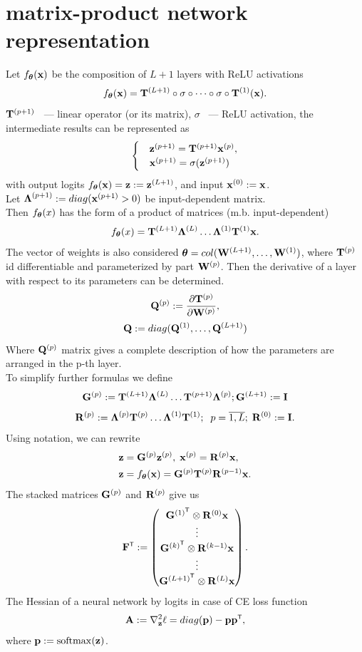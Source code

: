 \documentclass[conference]{IEEEtran}
\begin{document}
\section{matrix-product network representation}
Let $f_{\boldsymbol{\theta}}(\mathbf{x})$ be the composition of $L+1$ layers with ReLU activations
\[f_{\boldsymbol{\theta}}(\mathbf{x}) = \mathbf{T}^{(L+1)} \circ \sigma \circ \dots \circ \sigma \circ \mathbf{T}^{(1)}(\mathbf{x}).\]
$\mathbf{T}^{(p+1)}$ ~--- linear operator (or its matrix), $\sigma$ ~--- ReLU activation, the intermediate results can be represented as
\begin{align*}
  \begin{cases}
    & \mathbf{z}^{(p+1)} = \mathbf{T}^{(p+1)}\mathbf{x}^{(p)}, \\
    & \mathbf{x}^{(p+1)} = \sigma(\mathbf{z}^{(p+1)})
  \end{cases}
\end{align*}
with output logits $f_{\boldsymbol{\theta}}(\mathbf{x}) = \mathbf{z} := \mathbf{z}^{(L+1)}$, and input $\mathbf{x}^{(0)} := \mathbf{x}$. \\
Let $\boldsymbol{\Lambda}^{(p+1)} := diag(\mathbf{x}^{(p+1)} > 0)$ be input-dependent matrix. \\
Then $f_{\boldsymbol{\theta}}(x)$ has the form of a product of matrices (m.b. input-dependent)
\begin{equation}\label{eq:net-repr}
\f{x} = \bT^{(L+1)}\bLambda^{(L)}\dots \bLambda^{(1)}\bT^{(1)}\bx. \\
\end{equation}
The vector of weights is also considered $\boldsymbol{\theta} = col(\mathbf{W}^{(L+1)}, \dots, \mathbf{W}^{(1)})$, where $\mathbf{T}^{(p)}$ id differentiable and parameterized by part $\mathbf{W}^{(p)}$. Then the derivative of a layer with respect to its parameters can be determined. \\
\[\mathbf{Q}^{(p)} := \frac{\partial \mathbf{T}^{(p)}}{\partial \mathbf{W}^{(p)}},\]
\[\mathbf{Q}:= diag({\mathbf{Q}}^{(1)}, \dots, {\mathbf{Q}}^{(L+1)})\]
Where $\mathbf{Q}^{(p)}$ matrix gives a complete description of how the parameters are arranged in the p-th layer. \\
To simplify further formulas we define
\[ \mathbf{G}^{(p)} := \mathbf{T}^{(L+1)}\boldsymbol{\Lambda}^{(L)} \dots \mathbf{T}^{(p+1)}\boldsymbol{\Lambda}^{(p)}; \mathbf{G}^{(L+1)} := \mathbf{I} \]
\[\mathbf{R}^{(p)} := \boldsymbol{\Lambda}^{(p)}\mathbf{T}^{(p)} \dots \boldsymbol{\Lambda}^{(1)}\mathbf{T}^{(1)};\;\;p = \overline{1,L}; \; \mathbf{R}^{(0)} := \mathbf{I}.\]
Using notation, we can rewrite
\begin{align*}
& \mathbf{z} = \mathbf{G}^{(p)}\mathbf{z}^{(p)},\; \mathbf{x}^{(p)} = \mathbf{R}^{(p)}\mathbf{x}, \\
& \mathbf{z} = f_{\boldsymbol{\theta}}(\mathbf{x}) = \mathbf{G}^{(p)}\mathbf{T}^{(p)}\mathbf{R}^{(p-1)}\mathbf{x}.
\end{align*}
The stacked matrices $\mathbf{G}^{(p)}$ and $\mathbf{R}^{(p)}$ give us
\begin{align*}
\bF\T := 
    \begin{pmatrix}
        \bG^{(1)\T} \otimes \bR^{(0)}\bx \\
        \vdots \\
        \bG^{(k)\T} \otimes \bR^{(k-1)}\bx \\
        \vdots \\
        \bG^{(L+1)\T} \otimes \bR^{(L)}\bx
    \end{pmatrix}.
\end{align*}
The Hessian of a neural network by logits in case of CE loss function
\[ \bA := \nabla^2_{\bz} \ell = diag(\bp) - \bp\bp\T, \]
where $\mathbf{p} := \mathrm{softmax}(\mathbf{z})$.
\end{document}
